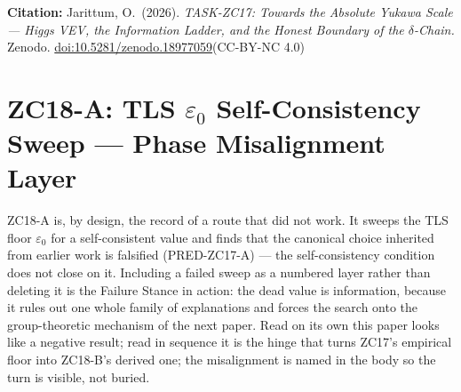 \documentclass[12pt, a4paper]{article}
\begin{document}
\bigskip
\begin{center}
\textbf{Citation:} Jarittum, O.\ (2026).
\textit{TASK-ZC17: Towards the Absolute Yukawa Scale ---
Higgs VEV, the Information Ladder, and the Honest Boundary
of the $\delta$-Chain.}
Zenodo. \href{https://doi.org/10.5281/zenodo.18977059}%
{doi:10.5281/zenodo.18977059}\quad (CC-BY-NC 4.0)
\end{center}

\bigskip


\section{ZC18-A: TLS $\varepsilon_0$ Self-Consistency Sweep --- Phase Misalignment Layer}
\label{sec:zc18a-tracka}

ZC18-A is, by design, the record of a route that did not work. It sweeps the TLS
floor $\varepsilon_0$ for a self-consistent value and finds that the canonical
choice inherited from earlier work is falsified (PRED-ZC17-A) --- the
self-consistency condition does not close on it. Including a failed sweep as a
numbered layer rather than deleting it is the Failure Stance in action: the dead
value is information, because it rules out one whole family of explanations and
forces the search onto the group-theoretic mechanism of the next paper. Read on
its own this paper looks like a negative result; read in sequence it is the
hinge that turns ZC17's empirical floor into ZC18-B's derived one; the
misalignment is named in the body so the turn is visible, not buried.
\end{document}

